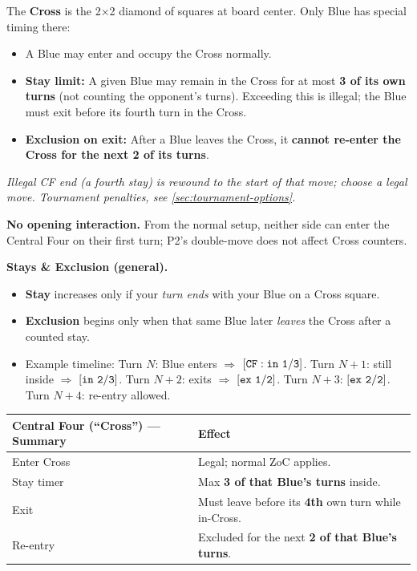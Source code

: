 \documentclass[11pt]{article}
\begin{document}
The \textbf{Cross} is the 2×2 diamond of squares at board center. Only Blue has special timing there:
\begin{itemize}
  \item A Blue may enter and occupy the Cross normally.
  \item \textbf{Stay limit:} A given Blue may remain in the Cross for at most \textbf{3 of its own turns} (not counting the opponent’s turns). Exceeding this is illegal; the Blue must exit before its fourth turn in the Cross.
  \item \textbf{Exclusion on exit:} After a Blue leaves the Cross, it \textbf{cannot re-enter the Cross for the next 2 of its turns}.
\end{itemize}

\noindent\emph{Illegal CF end (a fourth stay) is rewound to the start of that move; choose a legal move. Tournament penalties, see \ref{sec:tournament-options}.}

\begin{tcolorbox}[enhanced,breakable,title={Rules Note — Cross Timers \& the Opening Double-Move},
  colback=white,colframe=royal,boxrule=0.8pt]
\small
\textbf{No opening interaction.} From the normal setup, neither side can enter the Central Four on their first turn; P2’s double-move does not affect Cross counters.

\textbf{Stays \& Exclusion (general).}
\begin{itemize}[leftmargin=1.1em,itemsep=0.2em]
  \item \textbf{Stay} increases only if your \emph{turn ends} with your Blue on a Cross square.
  \item \textbf{Exclusion} begins only when that same Blue later \emph{leaves} the Cross after a counted stay.
  \item Example timeline: Turn \(N\): Blue enters \(\Rightarrow\) \([{\tt CF:in~1/3}]\). Turn \(N{+}1\): still inside \(\Rightarrow\) \([{\tt in~2/3}]\). Turn \(N{+}2\): exits \(\Rightarrow\) \([{\tt ex~1/2}]\). Turn \(N{+}3\): \([{\tt ex~2/2}]\). Turn \(N{+}4\): re-entry allowed.
\end{itemize}
\end{tcolorbox}

\noindent\begin{tabularx}{\linewidth}{@{}l X@{}}
\toprule
\textbf{Central Four (“Cross”) — Summary} & \textbf{Effect}\\
\midrule
Enter Cross & Legal; normal ZoC applies.\\
Stay timer & Max \textbf{3 of that Blue’s turns} inside.\\
Exit & Must leave before its \textbf{4th} own turn while in-Cross.\\
Re-entry & Excluded for the next \textbf{2 of that Blue’s turns}.\\
\bottomrule
\end{tabularx}
\end{document}
